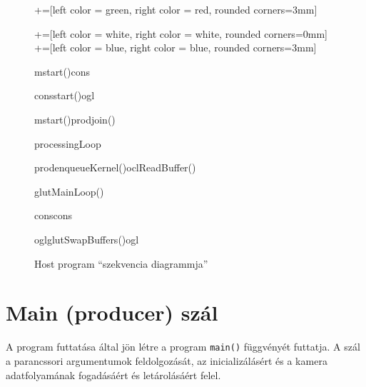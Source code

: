 \begin{figure}[H]
	
	\begin{sequencediagram}
	+=[left color = green, right color = red, rounded corners=3mm]
	
	+=[left color = white, right color = white, rounded corners=0mm]
	+=[left color = blue, right color = blue, rounded corners=3mm]
		\begin{call}{m}{start()}{cons}{}
			
		\begin{messcall}{cons}{start()}{ogl}
			\begin{call}{m}{start()}{prod}{join()}
			
			\begin{sdblock}{processingLoop}{}
				\begin{call}{prod}{enqueueKernel()}{ocl}{ReadBuffer()}
				\end{call}
				
				
				\begin{sdblock}{glutMainLoop()}{}
					\begin{call}{cons}{}{cons}{}
					\end{call}
				\end{sdblock}
				
				
				\begin{call}{ogl}{glutSwapBuffers()}{ogl}{}
				\end{call}
			\end{sdblock}
			
			\end{call}
			
		\end{messcall}
		
		\end{call}
	\end{sequencediagram}


  \caption{Host program ``szekvencia diagrammja''}
  \label{fig:host_seq}  
\end{figure}

	
\section{Main (producer) szál}
	A program futtatása által jön létre a program \texttt{main()} függvényét futtatja. A szál a parancssori argumentumok
	feldolgozását, az inicializálásért és a kamera adatfolyamának fogadásáért és letárolásáért felel.

